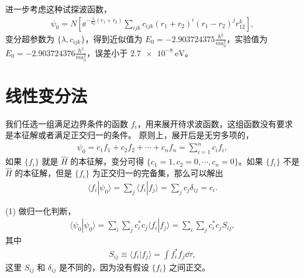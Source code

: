 进一步考虑这种试探波函数，
\begin{align}
    \psi_0 = N \left[ 
        \ee^{-\frac{\lambda}{a_0}(r_1 + r_2)}
    \sum_{ijk} c_{ijk} (r_1 + r_2)^i (r_1 - r_2)^j r_{12}^k
    \right],
\end{align}
变分超参数为 $\{\lambda, c_{ijk}\}$，得到近似值为 $E_0 = \num{-2.903724375} \frac{\hbar^2}{ma_0^2}$，实验值为 $E_0 = \num{-2.903724376} \frac{\hbar^2}{ma_0^2}$，误差小于 $\SI{2.7e-8}{\electronvolt}$。

\section{线性变分法}

我们任选一组满足边界条件的函数 $f_i$，用来展开待求波函数，这组函数没有要求是本征解或者满足正交归一的条件。
原则上，展开后是无穷多项的，
\begin{align}
    \psi_0 = c_1 f_1 + c_2 f_2 + \cdots + c_n f_n = \sum_{i=1}^n c_i f_i,
\end{align}
如果 $\{f_i\}$ 就是 $\hat H$ 的本征解，变分可得 $\{c_1 = 1, c_2=0, \cdots, c_n =0\}$。如果 $\{f_i\}$ 不是 $\hat H$ 的本征解，但是 $\{f_i\}$ 为正交归一的完备集，那么可以解出
\begin{align}
    \langle f_i | \psi_0 \rangle = \sum_j \langle f_i | f_j \rangle = \sum_j c_j \delta_{ij} = c_i.
\end{align}

(1) 做归一化判断，
\begin{align}
    \langle \psi_0 | \psi_0 \rangle = \sum_{i}\sum_j c_i^* c_j \langle f_i | f_j \rangle = \sum_i \sum_j c_i^* c_j S_{ij}, 
\end{align}
其中
\begin{align}
    S_{ij} \equiv \langle f_i | f_j \rangle = \int f_i^* f_j \dd\tau, 
\end{align}
这里 $S_{ij}$ 和 $\delta_{ij}$ 是不同的，因为没有假设 $\{f_i\}$ 之间正交。

